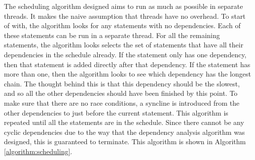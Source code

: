 The scheduling algorithm designed aims to run as much as possible in separate threads. It makes the naive assumption that threads have no overhead. To start of with, the algorithm looks for any statements with no dependencies. Each of these statements can be run in a separate thread. For all the remaining statements, the algorithm looks selects the set of statements that have all their dependencies in the schedule already. If the statement only has one dependency, then that statement is added directly after that dependency. If the statement has more than one, then the algorithm looks to see which dependency has the longest chain. The thought behind this is that this dependency should be the slowest, and so all the other dependencies should have been finished by this point. To make sure that there are no race conditions, a syncline is introduced from the other dependencies to just before the current statement. This algorithm is repeated until all the statements are in the schedule. Since there cannot be any cyclic dependencies due to the way that the dependency analysis algorithm was designed, this is guaranteed to terminate. This algorithm is shown in Algorithm \autoref{algorithm:scheduling}.
